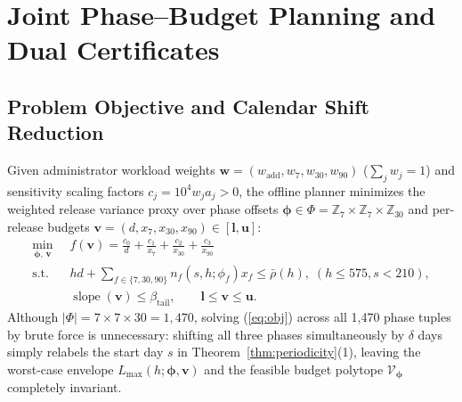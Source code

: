 \documentclass[sigconf, nonacm]{acmart}
\begin{document}
\section{Joint Phase--Budget Planning and Dual Certificates}
\label{sec:planner}

\subsection{Problem Objective and Calendar Shift Reduction}
Given administrator workload weights $\mathbf{w} = (w_{\mathrm{add}}, w_7, w_{30}, w_{90})$ ($\sum_j w_j = 1$) and sensitivity scaling factors $c_j = 10^4 w_j a_j > 0$, the offline planner minimizes the weighted release variance proxy over phase offsets $\boldsymbol{\phi} \in \Phi = \mathbb{Z}_7 \times \mathbb{Z}_7 \times \mathbb{Z}_{30}$ and per-release budgets $\mathbf{v} = (d, x_7, x_{30}, x_{90}) \in [\mathbf{l}, \mathbf{u}]$:
\begin{equation}
\label{eq:obj}
\begin{aligned}
\min_{\boldsymbol{\phi},\, \mathbf{v}}\;\; & f(\mathbf{v}) = \frac{c_0}{d} + \frac{c_1}{x_7} + \frac{c_2}{x_{30}} + \frac{c_3}{x_{90}} \\
\text{s.t.}\;\; & h d + \!\sum_{f \in \{7,30,90\}}\! n_f(s, h; \phi_f) x_f \le \bar{\rho}(h), \; (h \le 575, s < 210), \\
& \operatorname{slope}(\mathbf{v}) \le \beta_{\mathrm{tail}}, \qquad \mathbf{l} \le \mathbf{v} \le \mathbf{u}.
\end{aligned}
\end{equation}
Although $|\Phi| = 7 \times 7 \times 30 = 1{,}470$, solving (\ref{eq:obj}) across all 1,470 phase tuples by brute force is unnecessary: shifting all three phases simultaneously by $\delta$ days simply relabels the start day $s$ in Theorem~\ref{thm:periodicity}(1), leaving the worst-case envelope $L_{\max}(h; \boldsymbol{\phi}, \mathbf{v})$ and the feasible budget polytope $\mathcal{V}_{\boldsymbol{\phi}}$ completely invariant.
\end{document}
